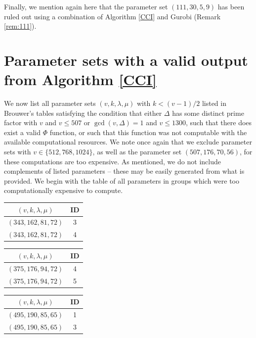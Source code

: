 \documentclass[12pt]{amsproc} %
\theoremstyle{definition}\newtheorem{defn}[thm]{Definition}
\theoremstyle{definition}\newtheorem{rem}[thm]{Remark}
\theoremstyle{definition}\newtheorem{ex}[thm]{Example}
\renewcommand\le{\leqslant}
\begin{document}
Finally, we mention again here that the parameter set $(111, 30, 5, 9)$ has been ruled out using a combination of Algorithm \ref{CCI} and Gurobi \cite{gurobi} (Remark \ref{rem:111}).


\newpage


\section{Parameter sets with a valid output from Algorithm \ref{CCI}}
\label{app:C}

We now list all parameter sets $(v, k, \lambda, \mu)$ with $k < (v-1)/2$ listed in Brouwer's tables \cite{brouwertables} satisfying the condition that either $\Delta$ has some distinct prime factor with $v$ and $v \le 507$ or $\gcd(v, \Delta) = 1$ and $v \le 1300$, such that there does exist a valid $\Phi$ function, or such that this function was not computable with the available computational resources.  We note once again that we exclude parameter sets with $v \in \{512, 768, 1024\}$, as well as the parameter set $(507, 176, 70, 56)$, for these computations are too expensive. As mentioned, we do not include complements of listed parameters -- these may be easily generated from what is provided. We begin with the table of all parameters in groups which were too computationally expensive to compute.


\begin{table}[ht]
    \centering
    \begin{minipage}{0.25\textwidth}
        \centering
        \begin{tabular}{c|c}
		 $(v, k, \lambda, \mu)$ & ID  \\ 
		 \hline
		 $(343, 162, 81, 72)$ & 3 \\
		 $(343, 162, 81, 72)$ & 4 \\
        \end{tabular}
    \end{minipage}
    \hfill
    \begin{minipage}{0.25\textwidth}
        \centering
        \begin{tabular}{c|c}
		 $(v, k, \lambda, \mu)$ & ID  \\
		 \hline
		 $(375,176,94,72)$ & 4 \\
		 $(375,176,94,72)$ & 5 \\
        \end{tabular}
    \end{minipage}
     \hfill
    \begin{minipage}{0.25\textwidth}
        \centering
        \begin{tabular}{c|c} 
		 $(v, k, \lambda, \mu)$ & ID  \\
		 \hline
		 $(495,190,85,65)$ & 1 \\
		 $(495,190,85,65)$ & 3 \\
        \end{tabular}
    \end{minipage}
\end{table}
\end{document}
